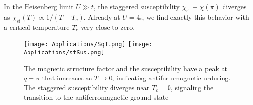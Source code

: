 %
In the Heisenberg limit $U \gg t$, the staggered susceptibility $\chi_{\text{st}} \equiv \chi (\pi)$ diverges as $\chi_{\text{st}} ( T ) \propto 1 / (T - T_c) $.
Already at $U = 4 t$, we find exactly this behavior with a critical temperature $T_c$ very close to zero.
\begin{figure}[H]\label{fig:SchiPi}
\texttt{[image: Applications/SqT.png]}
\texttt{[image: Applications/stSus.png]}
\caption[The magnetic structure factor and the  susceptibility have a peak at $q = \pi$ that increases as $T\rightarrow 0$, indicating \emph{antiferromagnetic ordering}.
 Divergence of the staggered susceptibility near $T_c = 0$, signaling the transition to the antiferromagnetic ground state.]{The magnetic structure factor and the susceptibility have a peak at $q = \pi$ that increases as $T\rightarrow 0$, indicating antiferromagnetic ordering.
The staggered susceptibility diverges near $T_c = 0$, signaling the transition to the antiferromagnetic ground state.}
\end{figure}

